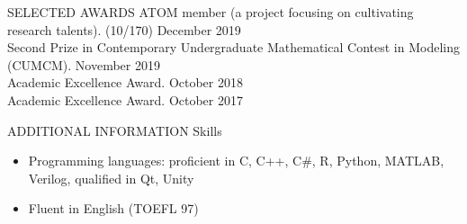 \documentclass{resume} %
\begin{document}
\begin{rSection}{SELECTED AWARDS}
{ATOM member (a project focusing on cultivating research talents). (10/170)} \hfill December 2019\\
{Second Prize in Contemporary Undergraduate Mathematical Contest in Modeling (CUMCM).} \hfill November 2019\\
{ Academic Excellence Award.} \hfill October 2018\\ 
{ Academic Excellence Award.} \hfill October 2017\\ 


\end{rSection}


\begin{rSection}{ADDITIONAL INFORMATION}   
Skills
	\begin{itemize}
	\item Programming languages: proficient in C, C++, C\#, R, Python, MATLAB, Verilog, qualified in Qt, Unity
	\item Fluent in English (TOEFL 97)
	\end{itemize}
\end{rSection}
\end{document}
